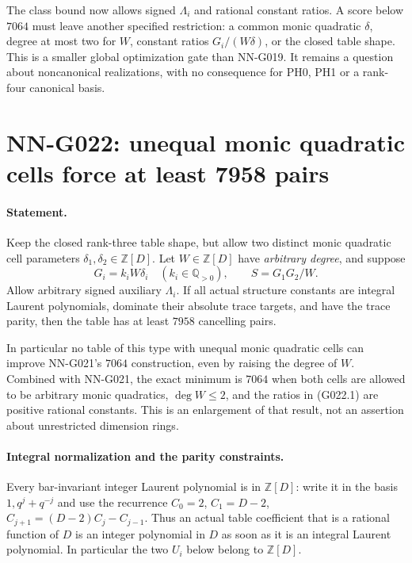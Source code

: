 The class bound now allows signed $\Lambda_i$ and rational
constant ratios. A score below $7064$ must leave another
specified restriction: a common monic quadratic $\delta$,
degree at most two for $W$, constant ratios $G_i/(W\delta)$,
or the closed table shape. This is a smaller global
optimization gate than NN-G019. It remains a question
about noncanonical realizations, with no consequence for
PH0, PH1 or a rank-four canonical basis.



\section{NN-G022: unequal monic quadratic cells force at least 7958 pairs}
\paragraph{Statement.}
Keep the closed rank-three table shape, but allow two distinct monic
quadratic cell parameters $\delta_1,\delta_2\in\mathbb Z[D]$.
Let $W\in\mathbb Z[D]$ have \emph{arbitrary degree}, and suppose
\[
 G_i=k_iW\delta_i\quad(k_i\in\mathbb Q_{>0}),\qquad
 S=G_1G_2/W.
 \tag{G022.1}
\]
Allow arbitrary signed auxiliary $\Lambda_i$. If all actual
structure constants are integral Laurent polynomials, dominate
their absolute trace targets, and have the trace parity, then
the table has at least $7958$ cancelling pairs.

In particular no table of this type with unequal monic quadratic
cells can improve NN-G021's $7064$ construction, even by raising
the degree of $W$. Combined with NN-G021, the exact minimum is
$7064$ when both cells are allowed to be arbitrary monic quadratics,
$\deg W\le2$, and the ratios in (G022.1) are positive rational
constants. This is an enlargement of that result, not an assertion
about unrestricted dimension rings.

\paragraph{Integral normalization and the parity constraints.}
Every bar-invariant integer Laurent polynomial is in $\mathbb Z[D]$:
write it in the basis $1,q^j+q^{-j}$ and use the recurrence
$C_0=2$, $C_1=D-2$, $C_{j+1}=(D-2)C_j-C_{j-1}$.
Thus an actual table coefficient that is a rational function of
$D$ is an integer polynomial in $D$ as soon as it is an integral
Laurent polynomial. In particular the two $U_i$ below belong
to $\mathbb Z[D]$.

